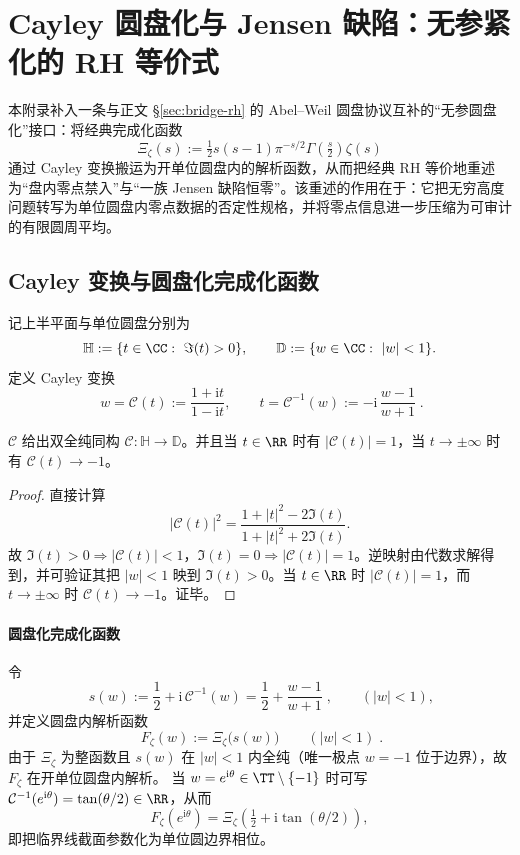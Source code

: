 \section{Cayley 圆盘化与 Jensen 缺陷：无参紧化的 RH 等价式}\label{app:cayley-disk-jensen}
本附录补入一条与正文 \S\ref{sec:bridge-rh} 的 Abel--Weil 圆盘协议互补的“无参圆盘化”接口：将经典完成化函数
$$
\Xi_\zeta(s):=\tfrac12 s(s-1)\pi^{-s/2}\Gamma\!\left(\tfrac{s}{2}\right)\zeta(s)
$$
通过 Cayley 变换搬运为开单位圆盘内的解析函数，从而把经典 RH 等价地重述为“盘内零点禁入”与“一族 Jensen 缺陷恒零”。该重述的作用在于：它把无穷高度问题转写为单位圆盘内零点数据的否定性规格，并将零点信息进一步压缩为可审计的有限圆周平均。

\subsection{Cayley 变换与圆盘化完成化函数}
记上半平面与单位圆盘分别为
$$
\mathbb{H}:=\{t\in\CC:\ \Im(t)>0\},\qquad
\mathbb{D}:=\{w\in\CC:\ |w|<1\}.
$$
定义 Cayley 变换
$$
\boxed{\;
w=\mathcal{C}(t):=\frac{1+\mathrm{i}t}{1-\mathrm{i}t},
\qquad
t=\mathcal{C}^{-1}(w):=-\mathrm{i}\,\frac{w-1}{w+1}\; }.
$$

\begin{proposition}\label{prop:app-cayley-upperhalf-disk-rh}
\(\mathcal{C}\) 给出双全纯同构 \(\mathcal{C}:\mathbb{H}\to\mathbb{D}\)。并且当 \(t\in\RR\) 时有 \(|\mathcal{C}(t)|=1\)，当 \(t\to\pm\infty\) 时有 \(\mathcal{C}(t)\to-1\)。
\end{proposition}
\begin{proof}
直接计算
$$
|\mathcal{C}(t)|^2=\frac{1+|t|^2-2\Im(t)}{1+|t|^2+2\Im(t)}.
$$
故 \(\Im(t)>0\Rightarrow |\mathcal{C}(t)|<1\)，\(\Im(t)=0\Rightarrow |\mathcal{C}(t)|=1\)。逆映射由代数求解得到，并可验证其把 \(|w|<1\) 映到 \(\Im(t)>0\)。当 \(t\in\RR\) 时 \(|\mathcal{C}(t)|=1\)，而 \(t\to\pm\infty\) 时 \(\mathcal{C}(t)\to-1\)。证毕。
\end{proof}

\paragraph{圆盘化完成化函数}
令
$$
\boxed{\;
s(w):=\frac12+\mathrm{i}\,\mathcal{C}^{-1}(w)=\frac12+\frac{w-1}{w+1}\; },
\qquad (|w|<1),
$$
并定义圆盘内解析函数
$$
\boxed{\;
F_\zeta(w):=\Xi_\zeta\!\bigl(s(w)\bigr)\qquad(|w|<1)\; }.
$$
由于 \(\Xi_\zeta\) 为整函数且 \(s(w)\) 在 \(|w|<1\) 内全纯（唯一极点 \(w=-1\) 位于边界），故 \(F_\zeta\) 在开单位圆盘内解析。
当 \(w=e^{\mathrm{i}\theta}\in\TT\setminus\{-1\}\) 时可写 \(\mathcal{C}^{-1}(e^{\mathrm{i}\theta})=\tan(\theta/2)\in\RR\)，从而
$$
F_\zeta(e^{\mathrm{i}\theta})=\Xi_\zeta\!\left(\tfrac12+\mathrm{i}\tan(\theta/2)\right),
$$
即把临界线截面参数化为单位圆边界相位。


